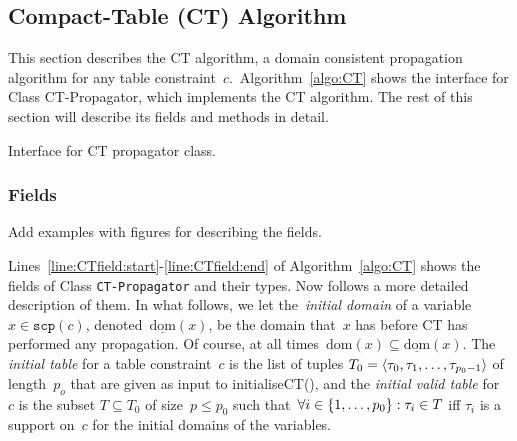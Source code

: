 \documentclass[a4paper,11pt]{article}
\newcommand{\Todo}[1]{{\color{blue}#1}}
\newcommand{\Algoref}[1]{Algorithm~\ref{#1}}
\newcommand{\Linesref}[2]{Lines~\ref{#1}-\ref{#2}}
\newcommand{\Dom}[1]{\text{dom}({#1})}
\newcommand{\Dominit}[1]{\underline{\text{dom}}(#1)}
\newcommand{\SparseBitSet}{\texttt{SparseBitSet}}
\newcommand{\Scp}{\texttt{scp}}
\numberwithin{equation}{section}
\begin{document}
\subsection{Compact-Table (CT) Algorithm}
This section describes the CT algorithm, a domain consistent propagation
algorithm for any table constraint~$c$.~\Algoref{algo:CT} shows the interface
for Class CT-Propagator, which implements the CT algorithm. The rest of this
section will describe its fields and methods in detail.


 \begin{algorithm}[H]
  \begin{algorithmic}[1]  %
    
    \end{algorithmic}
  \caption{Interface for CT propagator class.}
  \label{algo:CT}
\end{algorithm}





\subsubsection{Fields}
\label{CT:fields}

\Todo{Add examples with figures for describing the fields.}

\Linesref{line:CTfield:start}{line:CTfield:end} of \Algoref{algo:CT}
shows the fields of Class \texttt{CT-Propagator} and their types.
Now follows a more detailed description of them. In what follows, we let
the~\emph{initial domain} of a variable~$x \in \Scp(c)$, denoted~$\Dominit{x}$,
be the domain that~$x$ has before CT has performed any propagation. Of course, at
all times~$\Dom{x} \subseteq \Dominit{x}$.
The \emph{initial table} for a table constraint~$c$ is the list of tuples
$T_0 = \left\langle\tau_0, \tau_1, \ldots, \tau_{p_0-1}\right\rangle$ of length~$p_o$
that are given as input to initialiseCT(), and the
\emph{initial valid table} for~$c$ is the subset $T \subseteq T_0$ of size~$p \leq p_0$
such that~$\forall i \in \left\{1, \ldots, p_0\right\}: \tau_i \in T$ iff $\tau_i$ 
is a support on~$c$ for the initial domains of the variables. 
\end{document}
